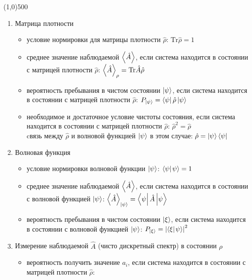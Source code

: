 


\fontsize{20}{24}
\line(1,0){500}
\fontsize{12}{15}
\begin{enumerate}[label=\textbf{\underline{\arabic*.}}]
\item Матрица плотности  \begin{itemize}
            \item условие нормировки для матрицы плотности $\hat{\rho}$:
            $ \text{Tr}\hat{\rho} = 1 $
            \item среднее значение наблюдаемой $\left< \hat{A} \right>$, если система находится в состоянии с матрицей плотности $\hat{\rho}$:
            $ \left< \hat{A} \right>_\rho = \text{Tr}\hat{A}\hat{\rho} $
            \item вероятность пребывания в чистом состоянии $\left| \psi \right>$, если система находится в состоянии с матрицей плотности $\hat{\rho}$:
            $ P_{\ket{\psi}} = \matrixel{\psi}{\hat{\rho}}{\psi} $
            \item необходимое и достаточное условие чистоты состояния, если система находится в состоянии с матрицей плотности $\hat{\rho}$:
            $ \hat{\rho}^2 = \hat{\rho}$ \\
            cвязь между $\hat{\rho}$ и волновой функцией $\left| \psi \right>$ в этом случае:
            $ \hat{\rho} = \left| \psi \right>\left< \psi \right| $
        \end{itemize}
\item Волновая функция  \begin{itemize}
            \item условие нормировки волновой функции $\left| \psi \right>$:
            $ \braket{\psi}{\psi}=1 $
            \item среднее значение наблюдаемой $\left< \hat{A} \right>$, если система находится в состоянии с волновой функцией $\left| \psi \right>$:
            $ \avg{\hat{A}}_{\ket{\psi}} = \matrixel{\psi}{\hat{A}}{\psi} $
            \item вероятность пребывания в чистом состоянии $\left| \xi \right>$, если система находится в состоянии с волновой функцией $\left| \psi \right>$:
            $ P_{\ket{\xi}} = \abs{\braket{\xi}{\psi}}^2 $
        \end{itemize}
\item Измерение наблюдаемой $\hat{A}$ (чисто дискретный спектр) в состоянии $\hat{\rho}$  \begin{itemize}
            \item вероятность получить значение $a_i$, если система находится в состоянии с матрицей плотности $\hat{\rho}$: \\

\end{itemize}
\end{enumerate}
